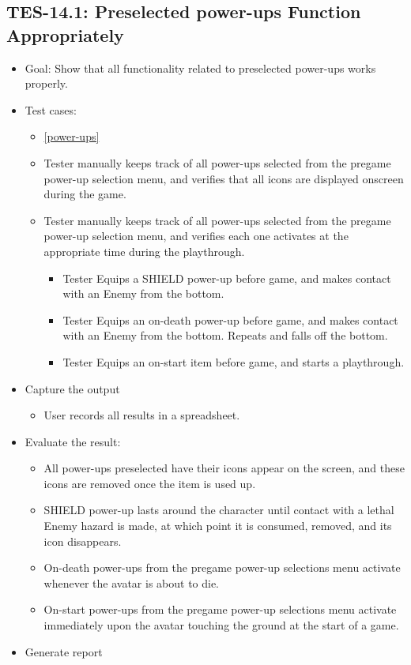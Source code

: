 \subsection{TES-14.1: Preselected power-ups Function Appropriately }
\begin{itemize}
\item Goal: Show that all functionality related to preselected power-ups works properly. 
\item Test cases: 

\begin{itemize}
\item \ref{power-ups}
\item Tester manually keeps track of all power-ups selected from the pregame power-up selection menu, and verifies that all
icons are displayed onscreen during the game.
\item Tester manually keeps track of all power-ups selected from the pregame power-up selection menu, and verifies each one 
activates at the appropriate time during the playthrough.
\begin{itemize}
\item Tester Equips a SHIELD power-up before game, and makes contact with an Enemy from the bottom.
\item Tester Equips an on-death power-up before game, and makes contact with an Enemy from the bottom. Repeats and falls off the bottom.
\item Tester Equips an on-start item before game, and starts a playthrough.
\end{itemize}
\end{itemize}
\item Capture the output 
\begin{itemize}
\item User records all results in a spreadsheet.
\end{itemize}
\item Evaluate the result: 

\begin{itemize}
\item All power-ups preselected have their icons appear on the screen, and these icons are removed once the item is used up.
\item SHIELD power-up lasts around the character until contact with a lethal Enemy hazard is made, at which point it is consumed, removed, and its icon disappears.
\item On-death power-ups from the pregame power-up selections menu activate whenever the avatar is about to die.
\item On-start power-ups from the pregame power-up selections menu activate immediately upon the avatar touching the ground at the start of a game.

\end{itemize}
\item Generate report 
\end{itemize}



